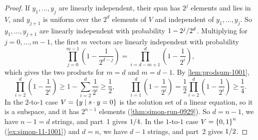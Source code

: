 \begin{exercisebox}
\begin{proof}
    If $y_1, \dots, y_j$ are linearly independent, their span has $2^j$ elements and lies in $V$,
    and $y_{j+1}$ is uniform over the $2^d$ elements of $V$ and independent of $y_1, \dots, y_j$. So $y_1, \dots, y_{j+1}$ are linearly independent with
    probability $1 - 2^j/2^d$. Multiplying for $j = 0, \dots, m-1$, the first $m$ vectors are
    linearly independent with probability
    \[\prod_{j=0}^{m-1} \left(1 - \frac{1}{2^{d-j}}\right) = \prod_{i=d-m+1}^{d} \left(1 - \frac{1}{2^i}\right),\]
    which gives the two products for $m = d$ and $m = d - 1$. By \cref{lem:prodsum-1001},
    \[\prod_{i=2}^{d} \left(1 - \frac{1}{2^i}\right) \geq 1 - \sum_{i=2}^{d} \frac{1}{2^i} \geq \frac{1}{2},
        \qquad
        \prod_{i=1}^{d} \left(1 - \frac{1}{2^i}\right) = \frac{1}{2} \prod_{i=2}^{d} \left(1 - \frac{1}{2^i}\right) \geq \frac{1}{4}.\]
    In the $2$-to-$1$ case $V = \left\lbrace y \mid s \cdot y = 0\right\rbrace$ is the solution set of a linear
    equation, so it is a subspace, and it has $2^{n-1}$ elements (\cref{thm:simon-run-0929}). So
    $d = n - 1$, we have $n - 1 = d$ strings, and part~1 gives $1/4$. In the $1$-to-$1$ case
    $V = \left\lbrace0,1\right\rbrace^n$ (\cref{ex:simon-11-1001}) and $d = n$, we have $d - 1$ strings, and part~2
    gives $1/2$.
\end{proof}
\end{exercisebox}
